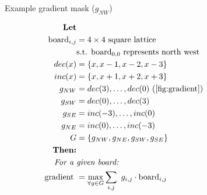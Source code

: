 \documentclass[journal]{IEEEtran}
\begin{document}
\begin{figure}[Hb]
\centering
    \caption{Example gradient mask ($g_{NW}$)}
\label{fig:gradient}
\end{figure}

\begin{framed}
\begin{align*}
    \textbf{Let} \\
    \text{\ board}_{i,j} &= 4\times{}4 \text{\ square lattice} \\
                            &\text{s.t. } \text{board}_{0,0} \text{\ represents north west} \\
    dec(x) &= \left\{x, x-1, x-2, x-3\right\} \\
    inc(x) &= \left\{x, x+1, x+2, x+3\right\} \\
    g_{NW} &= {dec(3), \dots, dec(0)}~(\autoref{fig:gradient})\\
    g_{SW} &= {dec(0), \dots, dec(3)} \\
    g_{SE} &= {inc(-3), \dots, inc(0)} \\
    g_{NE} &= {inc(0), \dots, inc(-3)} \\
    G &= \left\{g_{NW}, g_{NE}, g_{SW}, g_{SE}\right\} \\
    \textbf{Then:} \\
    \textit{For a } & \textit{given board:} \\
    \text{gradient } &= \max\limits_{\forall{}g \in G}\sum\limits_{i,j}{{\ g_{i,j} \cdot \text{board}_{i,j}}}
\end{align*}
\end{framed}
\end{document}
